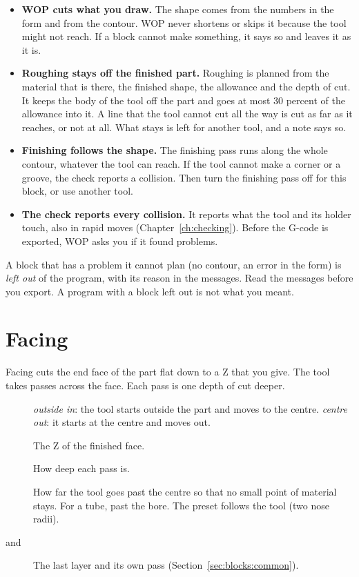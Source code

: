 \begin{itemize}
\item \textbf{WOP cuts what you draw.} The shape comes from the numbers in the form and from the contour. WOP never shortens or skips it because the tool might not reach. If a block cannot make something, it says so and leaves it as it is.
\item \textbf{Roughing stays off the finished part.} Roughing is planned from the material that is there, the finished shape, the allowance and the depth of cut. It keeps the body of the tool off the part and goes at most 30 percent of the allowance into it. A line that the tool cannot cut all the way is cut as far as it reaches, or not at all. What stays is left for another tool, and a note says so.
\item \textbf{Finishing follows the shape.} The finishing pass runs along the whole contour, whatever the tool can reach. If the tool cannot make a corner or a groove, the check reports a collision. Then turn the finishing pass off for this block, or use another tool.
\item \textbf{The check reports every collision.} It reports what the tool and its holder touch, also in rapid moves (Chapter~\ref{ch:checking}). Before the G-code is exported, WOP asks you if it found problems.
\end{itemize}

\begin{warningbox}
A block that has a problem it cannot plan (no contour, an error in the form) is \emph{left out} of the program, with its reason in the messages. Read the messages before you export. A program with a block left out is not what you meant.
\end{warningbox}

\section{Facing}\label{sec:blocks:facing}


Facing cuts the end face of the part flat down to a Z that you give. The tool takes passes across the face. Each pass is one depth of cut deeper.

\begin{description}
\item[] \emph{outside in}: the tool starts outside the part and moves to the centre. \emph{centre out}: it starts at the centre and moves out.
\item[] The Z of the finished face.
\item[] How deep each pass is.
\item[] How far the tool goes past the centre so that no small point of material stays. For a tube, past the bore. The preset follows the tool (two nose radii).
\item[ and ] The last layer and its own pass (Section~\ref{sec:blocks:common}).
\end{description}

